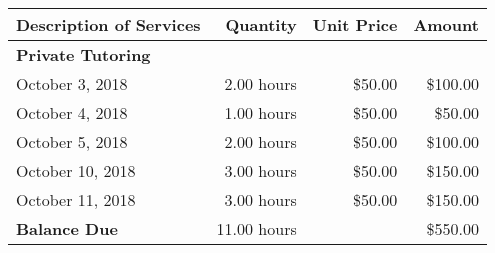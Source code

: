 \documentclass[a4paper,12pt]{report}
\begin{document}
\renewcommand{\arraystretch}{1.4}
\begin{center}
\begin{tabular}{lrrr}
\hline
\textbf{Description of Services} & \textbf{Quantity} & \textbf{Unit Price} & \textbf{Amount} \\ \hline
\textbf{Private Tutoring} & & & \\
October 3, 2018 & 2.00 hours & \$50.00 & \$100.00 \\ 
October 4, 2018 & 1.00 hours & \$50.00 & \$50.00 \\ 
October 5, 2018 & 2.00 hours & \$50.00 & \$100.00 \\ 
October 10, 2018 & 3.00 hours & \$50.00 & \$150.00 \\ 
October 11, 2018 & 3.00 hours & \$50.00 & \$150.00 \\ 

\hline 
\textbf{Balance Due} & 11.00 hours  & & \$550.00 \\
\end{tabular}
\end{center}
\end{document}
